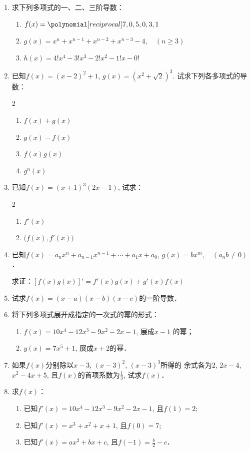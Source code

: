 \begin{enumerate}
    \item 求下列多项式的一、二、三阶导数：
\begin{enumerate}
    \item $f(x)=\poly{7,0,5,0,3,1}$
    \item $g(x)=x^n+x^{n-1}+x^{n-2}+x^{n-3}-4,\quad (n\ge 3)$
    \item $h(x)=4!x^4-3!x^3-2!x^2-1!x-0!$
\end{enumerate}
\item 已知$f(x)=(x-2)^2+1$, $g(x)=(x^2+\sqrt{2})^3$.
试求下列各多项式的导数：
\begin{multicols}{2}
\begin{enumerate}
    \item $f(x)+g(x)$
    \item $g (x) -f (x)$
    \item $f (x) g (x)$
    \item $g^n(x)$
\end{enumerate}
\end{multicols}

\item 已知$f(x)=(x+1)^3(2x-1)$, 试求：
\begin{multicols}{2}
    \begin{enumerate}
        \item $f'(x)$
        \item $\big(f(x),f'(x)\big)$
    \end{enumerate}
    \end{multicols}
\item 已知$f(x)=a_nx^n+a_{n-1}x^{n-1}+\cdots+a_1x+a_0$,
$g(x)=bx^m,\quad (a_nb\ne 0)$．

求证：$[f(x)g(x)]'=f'(x)g(x)+g'(x)f(x)$

\item 试求$f(x)=(x-a)(x-b)(x-c)$的一阶导数．
\item 将下列多项式展开成指定的一次式的幂的形式：
\begin{enumerate}
\item $f(x)=10x^4-12x^3-9x^2-2x-1$, 展成$x-1$
的幂；
\item $y(x)=7x^5+1$, 展成$x+2$的幂．
\end{enumerate}

\item 如果$f(x)$分别除以$x-3$, $(x-3)^2$, $(x-3)^3$所得的
余式各为$2$, $2x-4$, $x^2-4x+5$, 且$f(x)$的首项系数为$\frac{1}{3}$, 试求$f(x)$．
\item 求$f(x)$：
\begin{enumerate}
\item 已知$f'(x)=10x^4-12x^3-9x^2-2x-1$, 
且$f(1)=2$;
\item 已知$f'(x)=x^3+x^2+x+1$, 且$f(0)=7$;
\item 已知$f'(x)=ax^2+bx+c$, 且$f(-1)=\frac{b}{2}-c$．
\end{enumerate}


\end{enumerate}
